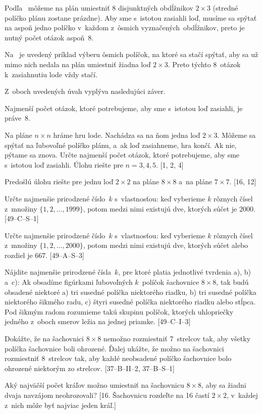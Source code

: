 {%
Podľa \obr\ môžeme na plán umiestniť 8 disjunktných obdĺžnikov $2\times3$ (stredné políčko plánu zostane prázdne). Aby sme s~istotou zasiahli loď, musíme sa spýtať na aspoň jedno políčko v~každom z~ôsmich vyznačených~obdĺžnikov, preto je nutný počet otázok aspoň~8.

Na \obr\ je uvedený príklad výberu ôsmich políčok, na ktoré sa stačí spýtať, aby sa už mimo nich nedala na plán umiestniť žiadna loď $2\times3$. Preto týchto 8~otázok k~zasiahnutiu lode vždy stačí.

Z~oboch uvedených úvah vyplýva nasledujúci záver.

\odpoved
Najmenší počet otázok, ktoré potrebujeme, aby sme s~istotou loď zasiahli, je práve~8.

Na pláne $n\times n$ hráme hru lode. Nachádza sa na ňom jedna loď $2\times3$. Môžeme sa spýtať na ľubovoľné políčko plánu, a~ak loď zasiahneme, hra končí. Ak nie, pýtame sa znova. Určte najmenší počet otázok, ktoré potrebujeme, aby sme s~istotou loď zasiahli. Úlohu riešte pre $n=3,4,5$. [1, 2, 4]

Predošlú úlohu riešte pre jednu loď $2\times 2$ na pláne $8\times8$ a~na pláne $7\times 7$. [16, 12]

\D
Určte najmenšie prirodzené číslo~$k$ s~vlastnosťou: keď vyberieme $k$ rôznych čísel z~množiny $\{1,2,\dots,1999\}$, potom medzi nimi existujú dve, ktorých súčet je $2000$. [49--C--S--1]

Určte najmenšie prirodzené číslo~$k$ s~vlastnosťou: keď vyberieme $k$ rôznych čísel z~množiny $\{1,2,\dots,2000\}$, potom medzi nimi existujú dve, ktorých súčet alebo rozdiel je $667$. [49--A--S--3]

Nájdite najmenšie prirodzené čísla~$k$, pre ktoré platia jednotlivé tvrdenia a), b) a~c): Ak obsadíme figúrkami ľubovoľných $k$~políčok šachovnice $8\times8$, tak budú obsadené niektoré
a) tri susedné políčka niektorého riadku,
b) tri susedné políčka niektorého šikmého radu,
c) štyri susedné políčka niektorého riadku alebo stĺpca.
Pod šikmým radom rozumieme takú skupinu políčok, ktorých uhlopriečky jedného z~oboch smerov ležia na jednej priamke. [49--C--I--3]

Dokážte, že na šachovnici $8\times8$ nemožno rozmiestniť 7~strelcov tak, aby všetky políčka šachovnice boli ohrozené. Ďalej ukážte, že možno na šachovnici rozmiestniť 8~strelcov tak, aby každé neobsadené políčko šachovnice bolo ohrozené niektorým zo strelcov. [37--B--II--2, 37--B--S--1]

Aký najväčší počet kráľov možno umiestniť na šachovnicu $8\times8$, aby sa žiadni dvaja navzájom neohrozovali? [16. Šachovnicu rozdeľte na 16 častí $2\times2$, v~každej z~nich môže byť najviac jeden kráľ.]

}

